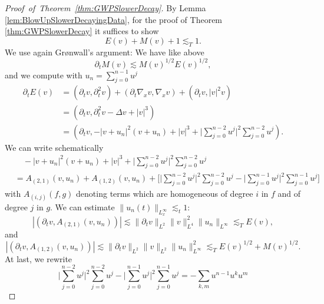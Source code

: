 \documentclass{amsart}
\theoremstyle{definition}
\numberwithin{equation}{section}
\begin{document}
\begin{proof}[Proof~of~Theorem~\ref{thm:GWPSlowerDecay}]
By Lemma \ref{lem:BlowUpSlowerDecayingData}, for the proof of Theorem \ref{thm:GWPSlowerDecay} it suffices to show
\begin{equation*}
E(v) + M(v) + 1 \lesssim_T 1.
\end{equation*}
We use again Gr\o nwall's argument: We have like above
\begin{equation*}
\partial_t M(v) \lesssim M(v)^{1/2} E(v)^{1/2},
\end{equation*}
and we compute with $u_n = \sum_{j=0}^{n-1} u^j$
\begin{equation*}
\begin{split}
\partial_t E(v) &= (\partial_t v, \partial_t^2 v) + (\partial_t \nabla_x v, \nabla_x v) + (\partial_t v, |v|^2 v) \\
&= (\partial_t v, \partial_t^2 v - \Delta v + |v|^3) \\
&= (\partial_t v, -|v+u_n|^2 (v+u_n) + |v|^3 + \big| \sum_{j=0}^{n-2} u^j \big|^2 \sum_{j=0}^{n-2} u^j).
\end{split}
\end{equation*}
We can write schematically
\begin{equation*}
\begin{split}
&\quad -|v+u_n|^2 (v+u_n) + |v|^3 + \big| \sum_{j=0}^{n-2} u^j \big|^2 \sum_{j=0}^{n-2} u^j \\
&= A_{(2,1)}(v,u_n) + A_{(1,2)}(v,u_n) + \big[ \big| \sum_{j=0}^{n-2} u^j \big|^2 \sum_{j=0}^{n-2} u^j - \big| \sum_{j=0}^{n-1} u^j \big|^2 \sum_{j=0}^{n-1} u^j \big]
\end{split}
\end{equation*}
with $A_{(i,j)}(f,g)$ denoting terms which are homogeneous of degree $i$ in $f$ and of degree $j$ in $g$. We can estimate
$\| u_n(t) \|_{L_x^\infty} \lesssim_t 1$:
\begin{equation*}
|(\partial_t v, A_{(2,1)}(v,u_n) )| \lesssim \| \partial_t  v\|_{L^2} \|v \|^2_{L^4} \| u_n \|_{L^\infty} \lesssim_T E(v),
\end{equation*}
and
\begin{equation*}
|(\partial_t v, A_{(1,2)}(v,u_n))| \lesssim \| \partial_t v \|_{L^2} \| v \|_{L^2} \| u_n \|^2_{L^\infty} \lesssim_T E(v)^{1/2} + M(v)^{1/2}.
\end{equation*}
At last, we rewrite
\begin{equation*}
\big| \sum_{j=0}^{n-2} u^j \big|^2 \sum_{j=0}^{n-2} u^j - \big| \sum_{j=0}^{n-1} u^j \big|^2 \sum_{j=0}^{n-1} u^j = - \sum_{k,m} u^{n-1} u^k u^m

\end{equation*}
\end{proof}
\end{document}

